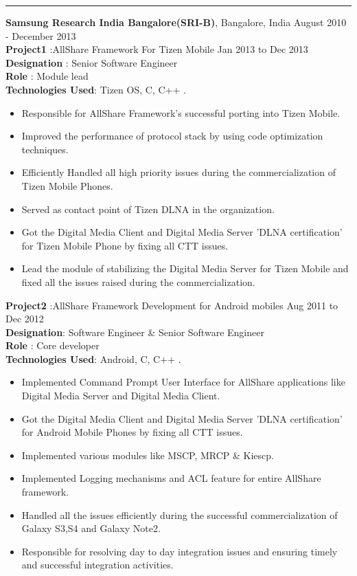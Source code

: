 \documentclass{resumeclass}
\begin{document}
\begin{resume}
\hfill   
\noindent\rule{20cm}{0.4pt}

{\large \textbf{Samsung Research India Bangalore(SRI-B)}, Bangalore, India} \hfill        August 2010 - December 2013 \\[0.5pt]

\textbf{Project1} :AllShare Framework For Tizen Mobile \hfill      Jan 2013 to Dec 2013 \\
\textbf{Designation} : Senior Software Engineer \\
\textbf{Role} : Module lead \\
\textbf{Technologies Used}: Tizen OS, C, C++ .

 \begin{itemize} \itemsep -2pt
  \item  Responsible for AllShare Framework's successful porting into Tizen Mobile.
  \item  Improved the performance of protocol stack by using code optimization techniques.
    \item  Efficiently Handled all high priority issues during the commercialization of Tizen Mobile Phones.
    \item Served as contact point of Tizen DLNA in the organization.
  \item Got the Digital Media Client and Digital Media Server 'DLNA certification' for Tizen Mobile Phone by fixing all CTT issues.
  \item Lead the module of stabilizing the Digital Media Server for Tizen Mobile and fixed all the issues raised during the commercialization.
\end{itemize} \vspace{-6pt}

\textbf{Project2} :AllShare Framework Development for Android mobiles \hfill      Aug 2011 to Dec 2012 \\
\textbf{Designation}: Software Engineer \& Senior Software Engineer\\
\textbf{Role} : Core developer\\
\textbf{Technologies Used}: Android, C, C++ .

 \begin{itemize} \itemsep -2pt
  \item  Implemented Command Prompt User Interface for AllShare applications like Digital Media Server and Digital Media Client.
  \item  Got the Digital Media Client and Digital Media Server 'DLNA certification' for Android Mobile Phones by fixing all CTT issues.
  \item  Implemented various modules like MSCP, MRCP \& Kiescp.
  \item  Implemented Logging mechanisms and ACL feature for entire AllShare framework.
  \item  Handled all the issues efficiently during the successful commercialization of Galaxy S3,S4 and Galaxy Note2.
  \item Responsible for resolving day to day integration issues and ensuring timely and successful integration activities.
\end{itemize} \vspace{-6pt}


\end{resume}
\end{document}
